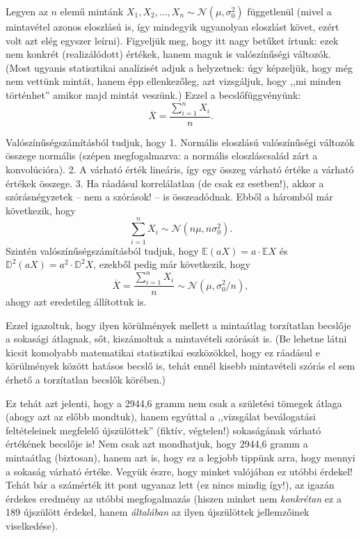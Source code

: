 \documentclass[]{book}
\begin{document}
Legyen az \(n\) elemű mintánk
\(X_1,X_2,\ldots,X_n\sim\mathcal{N}\left(\mu,\sigma_0^2\right)\)
függetlenül (mivel a mintavétel azonos eloszlású is, így mindegyik
ugyanolyan eloszlást követ, ezért volt azt elég egyszer leírni).
Figyeljük meg, hogy itt nagy betűket írtunk: ezek nem konkrét
(realizálódott) értékek, hanem maguk is valószínűségi változók. (Most
ugyanis statisztikai analízisét adjuk a helyzetnek: úgy képzeljük, hogy
még nem vettünk mintát, hanem épp ellenkezőleg, azt vizsgáljuk, hogy
,,mi minden történhet'' amikor majd mintát veszünk.) Ezzel a
becslőfüggvényünk: \[
    \overline{X}=\frac{\sum_{i=1}^n X_i}{n}.
\]

Valószínűségszámításból tudjuk, hogy 1. Normális eloszlású valószínűségi
változók összege normális (szépen megfogalmazva: a normális
eloszláscsalád zárt a konvolúcióra). 2. A várható érték lineáris, így
egy összeg várható értéke a várható értékek összege. 3. Ha ráadásul
korrelálatlan (de csak ez esetben!), akkor a szórásnégyzetek -- nem a
szórások! -- is összeadódnak. Ebből a háromból már következik, hogy \[
    \sum_{i=1}^n X_i\sim\mathcal{N}\left(n\mu,n\sigma_0^2\right).
\] Szintén valószínűségszámításból tudjuk, hogy
\(\mathbb{E}\left(aX\right)=a \cdot \mathbb{E}X\) és
\(\mathbb{D}^2\left(aX\right)=a^2 \cdot \mathbb{D}^2 X\), ezekből pedig
már következik, hogy \[
    \overline{X}=\frac{\sum_{i=1}^n X_i}{n} \sim \mathcal{N}\left(\mu,\sigma_0^2/n\right),
\] ahogy azt eredetileg állítottuk is.

Ezzel igazoltuk, hogy ilyen körülmények mellett a mintaátlag torzítatlan
becslője a sokasági átlagnak, sőt, kiszámoltuk a mintavételi szórását
is. (Be lehetne látni kicsit komolyabb matematikai statisztikai
eszközökkel, hogy ez ráadásul e körülmények között hatásos becslő is,
tehát ennél kisebb mintavételi szórás el sem érhető a torzítatlan
becslők körében.)

Ez tehát azt jelenti, hogy a 2944,6 gramm nem csak a születési tömegek
átlaga (ahogy azt az előbb mondtuk), hanem egyúttal a ,,vizsgálat
beválogatási feltételeinek megfelelő újszülöttek'' (fiktív, végtelen!)
sokaságának várható értékének becslője is! Nem csak azt mondhatjuk, hogy
2944,6 gramm a mintaátlag (biztosan), hanem azt is, hogy ez a legjobb
tippünk arra, hogy mennyi a sokaság várható értéke. Vegyük észre, hogy
minket valójában ez utóbbi érdekel! Tehát bár a számérték itt pont
ugyanaz lett (ez nincs mindig így!), az igazán érdekes eredmény az
utóbbi megfogalmazás (hiszen minket nem \emph{konkrétan} ez a 189
újszülött érdekel, hanem \emph{általában} az ilyen újszülöttek
jellemzőinek viselkedése).
\end{document}

